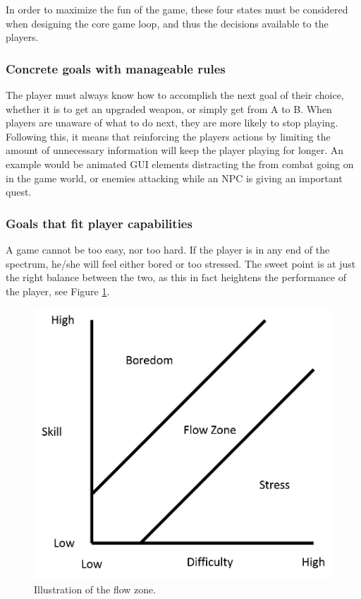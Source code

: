 In order to maximize the fun of the game, these four states must be considered when designing the core game loop, and thus the decisions available to the players.

\subsubsection{Concrete goals with manageable rules}
The player must always know how to accomplish the next goal of their choice, whether it is to get an upgraded weapon, or simply get from A to B.
When players are unaware of what to do next, they are more likely to stop playing.
Following this, it means that reinforcing the players actions by limiting the amount of unnecessary information will keep the player playing for longer.
An example would be animated GUI elements distracting the from combat going on in the game world, or enemies attacking while an NPC is giving an important quest.

\subsubsection{Goals that fit player capabilities}
A game cannot be too easy, nor too hard. 
If the player is in any end of the spectrum, he/she will feel either bored or too stressed.
The sweet point is at just the right balance between the two, as this in fact heightens the performance of the player, see Figure \ref{gamedesign:flowzone}.
\begin{figure}
    \includegraphics{figures/gamedesign/flowZone}
    \caption{Illustration of the flow zone.}
    \label{gamedesign:flowzone}
\end{figure}


